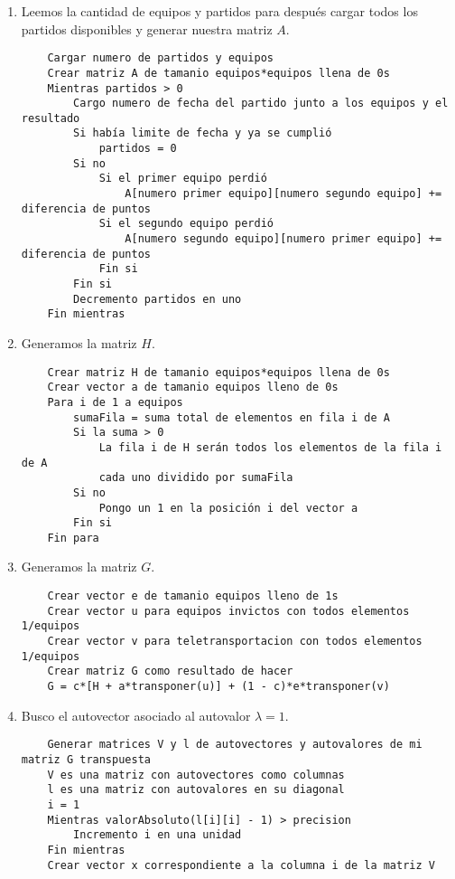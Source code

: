 \begin{enumerate}
	\item Leemos la cantidad de equipos y partidos para después cargar todos los
	partidos disponibles y generar nuestra matriz $A$.
	\begin{lstlisting}
	Cargar numero de partidos y equipos
	Crear matriz A de tamanio equipos*equipos llena de 0s
	Mientras partidos > 0
		Cargo numero de fecha del partido junto a los equipos y el resultado
		Si había limite de fecha y ya se cumplió
			partidos = 0
		Si no
			Si el primer equipo perdió
				A[numero primer equipo][numero segundo equipo] += diferencia de puntos
			Si el segundo equipo perdió
				A[numero segundo equipo][numero primer equipo] += diferencia de puntos
			Fin si
		Fin si
		Decremento partidos en uno
	Fin mientras
	\end{lstlisting}

	\item Generamos la matriz $H$.
	\begin{lstlisting}
	Crear matriz H de tamanio equipos*equipos llena de 0s
	Crear vector a de tamanio equipos lleno de 0s
	Para i de 1 a equipos
		sumaFila = suma total de elementos en fila i de A
		Si la suma > 0
			La fila i de H serán todos los elementos de la fila i de A
			cada uno dividido por sumaFila
		Si no
			Pongo un 1 en la posición i del vector a
		Fin si
	Fin para
	\end{lstlisting}

	\item Generamos la matriz $G$.
	\begin{lstlisting}
	Crear vector e de tamanio equipos lleno de 1s
	Crear vector u para equipos invictos con todos elementos 1/equipos
	Crear vector v para teletransportacion con todos elementos 1/equipos
	Crear matriz G como resultado de hacer
	G = c*[H + a*transponer(u)] + (1 - c)*e*transponer(v)
	\end{lstlisting}

	\item Busco el autovector asociado al autovalor $\lambda = 1$.
	\begin{lstlisting}
	Generar matrices V y l de autovectores y autovalores de mi matriz G transpuesta
	V es una matriz con autovectores como columnas
	l es una matriz con autovalores en su diagonal
	i = 1
	Mientras valorAbsoluto(l[i][i] - 1) > precision
		Incremento i en una unidad
	Fin mientras
	Crear vector x correspondiente a la columna i de la matriz V
	\end{lstlisting}


\end{enumerate}
